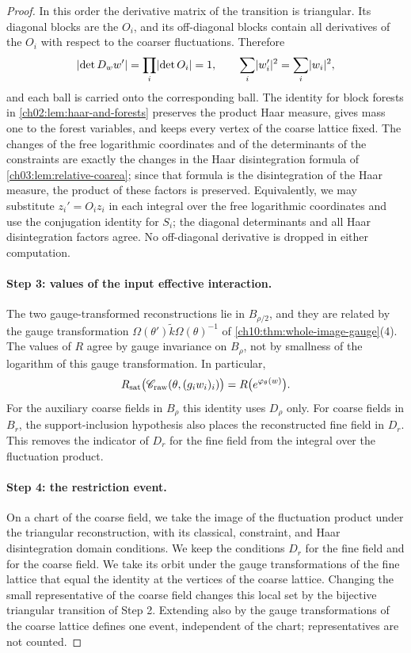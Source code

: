 \begin{proof}
In this order the derivative matrix of the transition is triangular. Its diagonal blocks are the $O_i$, and its off-diagonal blocks contain all derivatives of the $O_i$ with respect to the coarser fluctuations. Therefore
\[
 \lvert \det D_ww'\rvert=\prod_i\lvert \det O_i\rvert=1,\qquad \sum_i\lvert w_i'\rvert^2=\sum_i\lvert w_i\rvert^2,
\]
and each ball is carried onto the corresponding ball. The identity for block forests in \cref{ch02:lem:haar-and-forests} preserves the product Haar measure, gives mass one to the forest variables, and keeps every vertex of the coarse lattice fixed. The changes of the free logarithmic coordinates and of the determinants of the constraints are exactly the changes in the Haar disintegration formula of \cref{ch03:lem:relative-coarea}; since that formula is the disintegration of the Haar measure, the product of these factors is preserved. Equivalently, we may substitute $z_i'=O_iz_i$ in each integral over the free logarithmic coordinates and use the conjugation identity for $S_i$; the diagonal determinants and all Haar disintegration factors agree. No off-diagonal derivative is dropped in either computation.

\paragraph{Step 3: values of the input effective interaction.}
The two gauge-transformed reconstructions lie in $B_{\rho/2}$, and they are related by the gauge transformation $\Omega(\theta')\widetilde k\Omega(\theta)^{-1}$ of \cref{ch10:thm:whole-image-gauge}(4). The values of $R$ agree by gauge invariance on $B_\rho$, not by smallness of the logarithm of this gauge transformation. In particular,
\begin{equation}\label{ch10:eq:literal-inheritance}
 R_{\mathrm{sat}}\bigl({\mathscr C_{\mathrm{raw}}}(\theta,(g_iw_i)_i)\bigr)=R\bigl(e^{\varphi_\theta(w)}\bigr).
\end{equation}
For the auxiliary coarse fields in $B_\rho$ this identity uses $D_\rho$ only. For coarse fields in $B_r$, the support-inclusion hypothesis also places the reconstructed fine field in $D_r$. This removes the indicator of $D_r$ for the fine field from the integral over the fluctuation product.

\paragraph{Step 4: the restriction event.}
On a chart of the coarse field, we take the image of the fluctuation product under the triangular reconstruction, with its classical, constraint, and Haar disintegration domain conditions. We keep the conditions $D_r$ for the fine field and for the coarse field. We take its orbit under the gauge transformations of the fine lattice that equal the identity at the vertices of the coarse lattice. Changing the small representative of the coarse field changes this local set by the bijective triangular transition of Step 2. Extending also by the gauge transformations of the coarse lattice defines one event, independent of the chart; representatives are not counted.


\end{proof}
